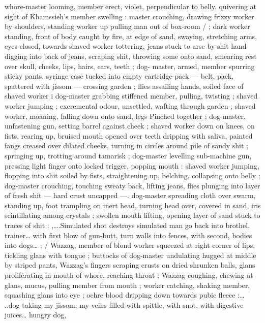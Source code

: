{whore-master looming, member erect, violet, perpendicular to belly. 
quivering at sight of Khamssieh's member swelling : master 
crouching, drawing frizzy worker by shoulders, standing worker up 
pulling man out of box-room {\slash} ; dark worker standing, front of body 
caught by fire, at edge of sand, swaying, stretching arms, eyes 
closed, towards shaved worker tottering, jeans stuck to arse by shit 
hand digging into back of jeans, scraping shit, throwing some onto 
sand, smearing rest over skull, cheeks, lips, hairs, ears, teeth ; dog- 
master, armed, member spurring sticky pants, syringe case tucked 
into empty cartridge-pack --- belt, pack, spattered with jissom --- 
crossing garden ; flies assailing hands, soiled face of shaved worker 
i dog-master grabbing stiffened member, pulling, twisting ; shaved 
worker jumping ; excremental odour, unsettled, wafting through 
garden ; shaved worker, moaning, falling down onto sand, legs 
Pinched together ; dog-master, unfastening gun, setting barrel 
against cheek ; shaved worker down on knees, on fists, rearing up, 
bruised mouth opened over teeth dripping with saliva, painted fangs 
creased over dilated cheeks, turning in circles around pile of sandy 
shit ; springing up, trotting around tamarisk ; dog-master levelling 
sub-machine gun, pressing light finger onto locked trigger, popping 
mouth : shaved worker jumping, flopping into shit soiled by fists, 
straightening up, belching, collapsing onto belly ; dog-master 
crouching, touching sweaty back, lifting jeans, flies plunging into 
layer of fresh shit --- hard crust uncapped ---. dog-master spreading 
cloth over swarm, standing up, foot trampling on inert head, turning 
head over, covered in sand, iris scintillating among crystals ; swollen 
mouth lifting, opening layer of sand stuck to traces of shit : 
{\gl},{\ldots}.Simulated shot destroys simulated man{\td} go back into brothel, 
trainer{\ldots} with first blow of gun-butt, turn walls into fences, with 
second, bodies into dogs{\ldots}{\td} {\gr} ; {\slash} Wazzag, member of blond worker 
squeezed at right corner of lips, tickling glans with tongue ; buttocks 
of dog-master undulating hugged at middle by striped pants, 
Wazzag's fingers scraping crusts on dried shrunken balls, glans 
proliferating in mouth of whore, reaching throat ; Wazzag coughing, 
chewing at glans, mucus, pulling member from mouth ; worker 
catching, shaking member, squashing glans into eye ; ochre blood 
dripping down towards pubic fleece :{\ldots} {\gl}..dog taking my jissom, my 
veins filled with spittle, with snot, with digestive juices{\ldots} hungry dog, 
}
